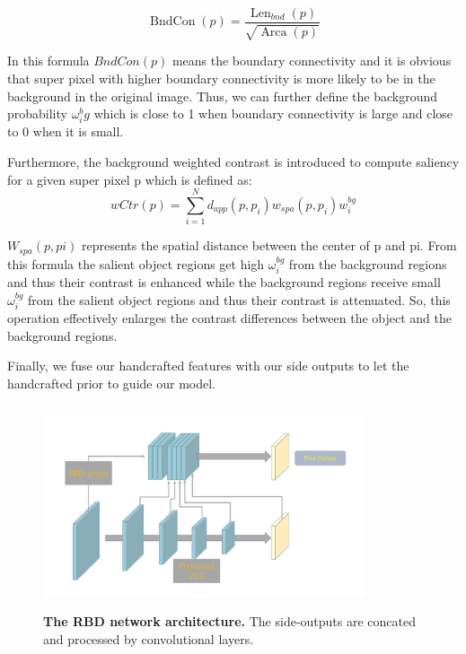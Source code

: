 \documentclass[10pt,journal, compsoc]{IEEEtran}
\begin{document}
\begin{equation}
\operatorname { BndCon } ( p ) = \frac { \operatorname { Len } _ { b n d } ( p ) } { \sqrt { \operatorname { Arca } ( p ) } }
\end{equation}

In this formula $BndCon(p)$ means the boundary connectivity and it is obvious that super pixel with higher boundary connectivity is more likely to be in the background in the original image. Thus, we can further define the background probability $\omega_i^bg$ which is close to 1 when boundary connectivity is large and close to 0 when it is small.

Furthermore, the background weighted contrast is introduced to compute saliency for a given super pixel p which is defined as:
\begin{equation}
w C t r ( p ) = \sum _ { i = 1 } ^ { N } d _ { a p p } \left( p , p _ { i } \right) w _ { s p a } \left( p , p _ { i } \right) w _ { i } ^ { b g }
\end{equation}

$W_{spa} (p, pi)$ represents the spatial distance between the center of p and pi. From this formula the salient object regions get high  $\omega_i^{bg}$ from the background regions and thus their contrast is enhanced while the background regions receive small $\omega_i^{bg}$ from the salient object regions and thus their contrast is attenuated. So, this operation effectively enlarges the contrast differences between the object and the background regions. 

Finally, we fuse our handcrafted features with our side outputs to let the handcrafted prior to guide our model.
\begin{figure}[!htbp]
	\centering
	\includegraphics[height=6.0cm,width=9.5cm]{figures/RBD_net.png}
	\caption{\textbf{The RBD network architecture.} The side-outputs are concated and processed by convolutional layers.}
\end{figure}
\end{document}
